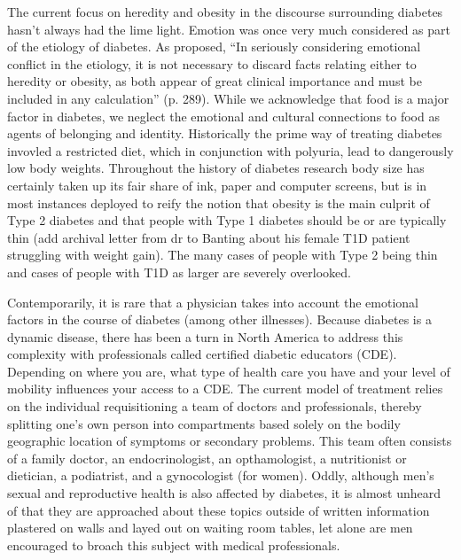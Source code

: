 \documentclass[12pt]{article}
\begin{document}
The current focus on heredity and obesity in the discourse surrounding diabetes hasn't always had the lime light. Emotion was once very much considered as part of the etiology of diabetes. As \citet{daniels_role_1948} proposed,
``In seriously considering emotional conflict in the etiology, it is not necessary to discard facts relating either to heredity or obesity, as both appear of great clinical importance and must be included in any calculation'' (p. 289). While we acknowledge that food is a major factor in diabetes, we neglect the emotional and cultural connections to food as agents of belonging and identity. Historically the prime way of treating diabetes invovled a restricted diet, which in conjunction with polyuria, lead to dangerously low body weights. Throughout the history of diabetes research body size has certainly taken up its fair share of ink, paper and computer screens, but is in most instances deployed to reify the notion that obesity is the main culprit of Type 2 diabetes and that people with Type 1 diabetes should be or are typically thin (add archival letter from dr to Banting about his female T1D patient struggling with weight gain). The many cases of people with Type 2 being thin and cases of people with T1D as larger are severely overlooked. 

Contemporarily, it is rare that a physician takes into account the emotional factors in the course of diabetes (among other illnesses). Because diabetes is a dynamic disease, there has been a turn in North America to address this complexity with professionals called certified diabetic educators (CDE). Depending on where you are, what type of health care you have and your level of mobility influences your access to a CDE. The current model of treatment relies on the individual requisitioning a team of doctors and professionals, thereby splitting one's own person into compartments based solely on the bodily geographic location of symptoms or secondary problems. This team often consists of a family doctor, an endocrinologist, an opthamologist, a nutritionist or dietician, a podiatrist, and a gynocologist (for women). Oddly, although men's sexual and reproductive health is also affected by diabetes, it is almost unheard of that they are approached about these topics outside of written information plastered on walls and layed out on waiting room tables, let alone are men encouraged to broach this subject with medical professionals. 
\end{document}
